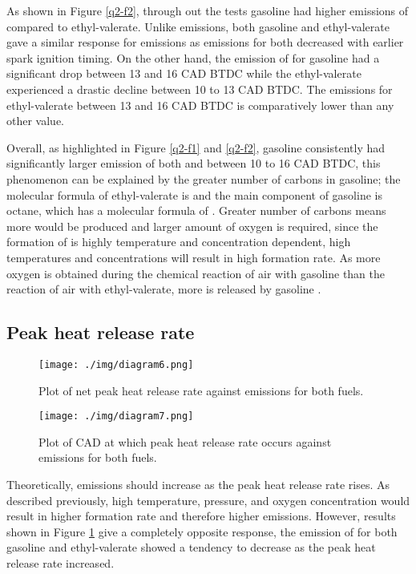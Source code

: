 As shown in Figure \ref{q2-f2}, through out the tests gasoline had higher emissions of  compared to ethyl-valerate. Unlike  emissions, both gasoline and ethyl-valerate gave a similar response for  emissions as emissions for both decreased with earlier spark ignition timing. On the other hand, the emission of  for gasoline had a significant drop between 13 and 16 CAD BTDC while the ethyl-valerate experienced a drastic decline between 10 to 13 CAD BTDC. The  emissions for ethyl-valerate between 13 and 16 CAD BTDC is comparatively lower than any other value.

Overall, as highlighted in Figure \ref{q2-f1} and \ref{q2-f2}, gasoline consistently had significantly larger emission of both  and   between 10 to 16 CAD BTDC, this phenomenon can be explained by the greater number of carbons in gasoline; the molecular formula of ethyl-valerate is  \cite{q2-r1} and the main component of gasoline is octane, which has a molecular formula of  \cite{q2-r2}. Greater number of carbons means more  would be produced and larger amount of oxygen is required, since the formation of  is highly temperature and  concentration dependent, high temperatures and  concentrations will result in high  formation rate. As more oxygen is obtained during the chemical reaction of air with gasoline than the reaction of air with ethyl-valerate, more  is released by gasoline \cite{q2-r3}.
\subsection*{Peak heat release rate}
\begin{figure}[H]
    \centering
    \texttt{[image: ./img/diagram6.png]}
    \caption{Plot of net peak heat release rate against  emissions for both fuels.}
    \label{q2-f3}
\end{figure}
\begin{figure}[H]
    \centering
    \texttt{[image: ./img/diagram7.png]}
    \caption{Plot of CAD at which peak heat release rate occurs against  emissions for both fuels.}
    \label{q2-f4}
\end{figure}
Theoretically,  emissions should increase as the peak heat release rate rises. As described previously, high temperature, pressure, and oxygen concentration would result in higher  formation rate and therefore higher emissions. However, results shown in Figure \ref{q2-f3} give a completely opposite response, the emission of  for both gasoline and ethyl-valerate showed a tendency to decrease as the peak heat release rate increased.

